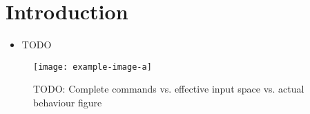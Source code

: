 \section{Introduction}

\begin{itemize}
	\item TODO
\end{itemize}

\lightlipsum[1-1]

\begin{figure}[htbp]
	\centering
	\texttt{[image: example-image-a]}
	\caption{TODO: Complete commands vs. effective input space vs. actual behaviour figure}
	\label{fig:robot_behaviour_intro}
\end{figure}

\lightlipsum[1-4]